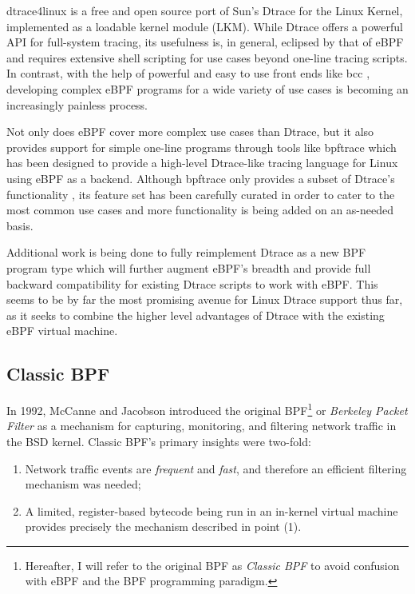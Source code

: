 \documentclass[
  12pt]{findlay}
\providecommand{\tightlist}{\setlength{\itemsep}{0pt}\setlength{\parskip}{0pt}}
\begin{document}
dtrace4linux \autocite{dtrace4linux} is a free and open source port of
Sun's Dtrace \autocite{cantrill04} for the Linux Kernel, implemented as
a loadable kernel module (LKM). While Dtrace offers a powerful API for
full-system tracing, its usefulness is, in general, eclipsed by that of
eBPF \autocite{gregg18} and requires extensive shell scripting for use
cases beyond one-line tracing scripts. In contrast, with the help of
powerful and easy to use front ends like bcc \autocite{bcc}, developing
complex eBPF programs for a wide variety of use cases is becoming an
increasingly painless process.

Not only does eBPF cover more complex use cases than Dtrace, but it also
provides support for simple one-line programs through tools like
bpftrace \autocite{gregg18,bpftrace} which has been designed to provide
a high-level Dtrace-like tracing language for Linux using eBPF as a
backend. Although bpftrace only provides a subset of Dtrace's
functionality \autocite{gregg18}, its feature set has been carefully
curated in order to cater to the most common use cases and more
functionality is being added on an as-needed basis.

Additional work is being done to fully reimplement Dtrace as a new BPF
program type \autocite{vanhees19} which will further augment eBPF's
breadth and provide full backward compatibility for existing Dtrace
scripts to work with eBPF. This seems to be by far the most promising
avenue for Linux Dtrace support thus far, as it seeks to combine the
higher level advantages of Dtrace with the existing eBPF virtual
machine.

\FloatBarrier

\hypertarget{classic-bpf}{%
\subsection{Classic BPF}\label{classic-bpf}}

In 1992, McCanne and Jacobson \autocite{bpf} introduced the original
BPF\footnote{Hereafter,
I will refer to the original BPF as {\itshape Classic BPF} to avoid confusion with eBPF and the BPF programming paradigm.}
or \emph{Berkeley Packet Filter} as a mechanism for capturing,
monitoring, and filtering network traffic in the BSD kernel. Classic
BPF's primary insights were two-fold:

\begin{enumerate}
\def\labelenumi{\arabic{enumi})}
\tightlist
\item
  Network traffic events are \emph{frequent} and \emph{fast}, and
  therefore an efficient filtering mechanism was needed;
\item
  A limited, register-based bytecode being run in an in-kernel virtual
  machine provides precisely the mechanism described in point (1).
\end{enumerate}
\end{document}
